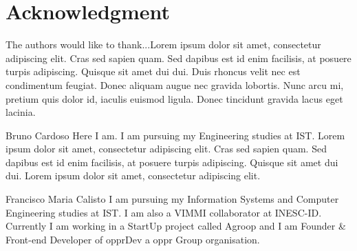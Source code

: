 \documentclass[a4paper,12pt,journal,twoside,compsoc]{PPIEEEtran}
\begin{document}
  \section*{} %
\else
  \section*{Acknowledgment}
\fi

The authors would like to thank...Lorem ipsum dolor sit amet, consectetur adipiscing elit. Cras sed sapien quam. Sed dapibus est id enim facilisis, at posuere turpis adipiscing. Quisque sit amet dui dui.
Duis rhoncus velit nec est condimentum feugiat. Donec aliquam augue nec gravida lobortis. Nunc arcu mi, pretium quis dolor id, iaculis euismod ligula. Donec tincidunt gravida lacus eget lacinia.

%

% 
\begin{IEEEbiography}{Bruno Cardoso}
Here I am. I am pursuing my Engineering studies at \ac{IST}. Lorem ipsum dolor sit amet, consectetur adipiscing elit. Cras sed sapien quam. Sed dapibus est id enim facilisis, at posuere turpis adipiscing. Quisque sit amet dui dui. Lorem ipsum dolor sit amet, consectetur adipiscing elit. 
\end{IEEEbiography}
\begin{IEEEbiography}
{Francisco Maria Calisto}
I am pursuing my Information Systems and Computer  Engineering studies at \ac{IST}. I am also a VIMMI collaborator at INESC-ID. Currently I am working in a StartUp project called Agroop and I am Founder \& Front-end Developer of opprDev a oppr Group organisation.
\end{IEEEbiography}
\end{document}
